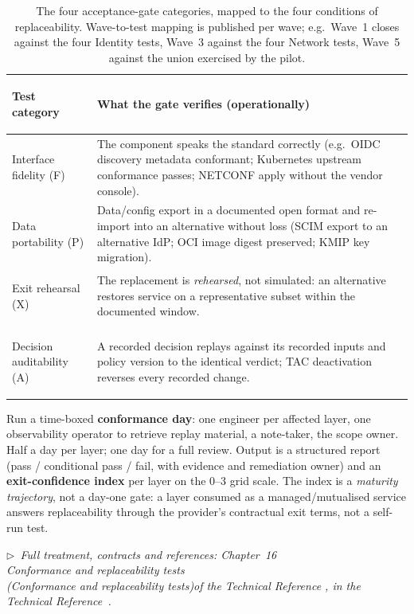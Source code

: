 \documentclass[11pt,a4paper,twoside]{article}
\newcommand{\keyword}[1]{\textbf{#1}}
\newcommand{\trchap}[2]{%
  Chapter~#1%
  \ifx\\#2\\\else\space(\emph{#2})\fi\space of the Technical Reference%
}
\newcommand{\mainref}[1]{%
  \par\vspace{1pt}
  {\footnotesize\color{gray}\itshape
  $\triangleright$~Full treatment, contracts and references: #1,
  in the Technical Reference~\cite{ng-tech-ref-2026}.}\par\vspace{2pt}}
\begin{document}
\begin{table}[h!]
\centering\small
\begin{tabularx}{\textwidth}{
  >{\bfseries\raggedright\arraybackslash}p{3.0cm} X}
\toprule
\textbf{Test category} & \textbf{What the gate verifies (operationally)} \\
\midrule
Interface fidelity (F) &
  The component speaks the standard correctly (e.g.\ OIDC discovery metadata
  conformant; Kubernetes upstream conformance passes; NETCONF apply without
  the vendor console). \\
\addlinespace
Data portability (P) &
  Data/config export in a documented open format and re-import into an
  alternative without loss (SCIM export to an alternative IdP; OCI image
  digest preserved; KMIP key migration). \\
\addlinespace
Exit rehearsal (X) &
  The replacement is \emph{rehearsed}, not simulated: an alternative restores
  service on a representative subset within the documented window. \\
\addlinespace
Decision auditability (A) &
  A recorded decision replays against its recorded inputs and policy version
  to the identical verdict; TAC deactivation reverses every recorded change. \\
\bottomrule
\end{tabularx}
\caption{The four acceptance-gate categories, mapped to the four conditions
of replaceability. Wave-to-test mapping is published per wave; e.g.\ Wave~1
closes against the four Identity tests, Wave~3 against the four Network
tests, Wave~5 against the union exercised by the pilot.}
\end{table}

\begin{principlebox}
Run a time-boxed \keyword{conformance day}: one engineer per affected layer,
one observability operator to retrieve replay material, a note-taker, the
scope owner. Half a day per layer; one day for a full review. Output is a
structured report (pass / conditional pass / fail, with evidence and
remediation owner) and an \keyword{exit-confidence index} per layer on the
0--3 grid scale. The index is a \emph{maturity trajectory}, not a day-one
gate: a layer consumed as a managed/mutualised service answers
replaceability through the provider's contractual exit terms, not a
self-run test.
\end{principlebox}

\mainref{\trchap{16}{Conformance and replaceability tests}}
\end{document}
